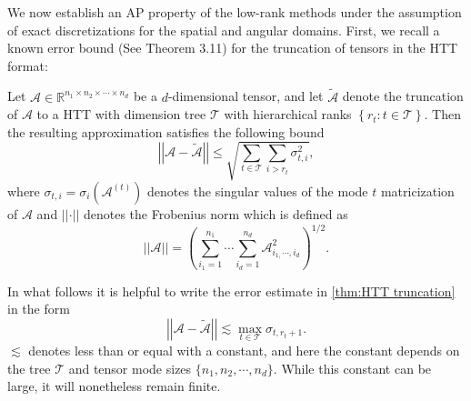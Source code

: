 \documentclass[onefignum,onetabnum]{siamart220329}
\begin{document}
We now establish an AP property of the low-rank methods under the assumption of exact discretizations for the spatial and angular domains. First, we recall a known error bound \cite{GrasedyckHTT2010} (See Theorem 3.11) for the truncation of tensors in the HTT format:
\begin{theorem}
    \label{thm:HTT truncation}
    Let $\mathcal{A} \in \mathbb{R}^{n_{1} \times n_{2} \times \cdots \times n_{d}}$ be a $d$-dimensional tensor, and let $\widetilde{\mathcal{A}}$ denote the truncation of $\mathcal{A}$ to a HTT with dimension tree $\mathcal{T}$ with hierarchical ranks $\left\{ r_{t} : t\in \mathcal{T} \right\}$. Then the resulting approximation satisfies the following bound
    \begin{equation*}
        \left\lvert\left\lvert \mathcal{A} - \widetilde{\mathcal{A}} \right\rvert\right\rvert \leq \sqrt{\sum_{t\in \mathcal{T}}\sum_{i > r_{t}} \sigma_{t,i}^{2} },
    \end{equation*}
    where $\sigma_{t,i} = \sigma_{i}\left( \mathcal{A}^{(t)} \right)$ denotes the singular values of the mode $t$ matricization of $\mathcal{A}$ and $ \left\lvert\left\lvert \cdot \right\rvert\right\rvert $ denotes the Frobenius norm which is defined as
    $$ \left\lvert\left\lvert \mathcal{A} \right\rvert\right\rvert = \left( \sum_{i_{1} = 1}^{n_{1}}\cdots \sum_{i_{d} = 1}^{n_{d}} \mathcal{A}_{i_{1,}\cdots, i_{d}}^{2} \right)^{1/2}.$$
\end{theorem}
In what follows it is helpful to write the error estimate in \cref{thm:HTT truncation} in the form
\begin{equation*}
    \left\lvert\left\lvert \mathcal{A} - \widetilde{\mathcal{A}} \right\rvert\right\rvert \lesssim \max_{t \in \mathcal{T}} \sigma_{t,r_{t}+1}.
\end{equation*}
$\lesssim$ denotes less than or equal with a constant, and here the constant depends on the tree $\mathcal{T}$ and tensor mode sizes $\{n_{1}, n_{2}, \cdots, n_{d}\}$. While this constant can be large, it will nonetheless remain finite.
\end{document}
